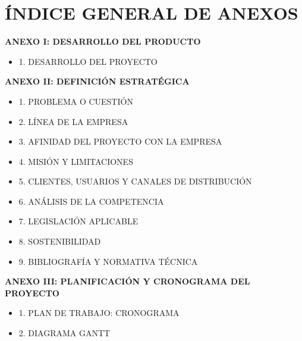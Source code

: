 \documentclass[11pt,a4paper]{article}
\begin{document}
\newpage
\section*{ÍNDICE GENERAL DE ANEXOS}

\vspace{0.5cm}

\begin{description}[style=nextline, leftmargin=0.5cm, font=\bfseries\color{ArthroNavy}]


    
   \item \textbf{ANEXO I: DESARROLLO DEL PRODUCTO} 
        \begin{itemize}[label=\color{ArthroGray}\circ, leftmargin=0.5cm, itemsep=0.2em, topsep=0.1cm]
            \small
            \item 1. DESARROLLO DEL PROYECTO 
        \end{itemize}
        
        \item \textbf{ANEXO II: DEFINICIÓN ESTRATÉGICA} 
        \begin{itemize}[label=\color{ArthroGray}\circ, leftmargin=0.5cm, itemsep=0.2em, topsep=0.1cm]
            \small
            \item 1. PROBLEMA O CUESTIÓN
            \item 2. LÍNEA DE LA EMPRESA 
            \item 3. AFINIDAD DEL PROYECTO CON LA EMPRESA 
            \item 4. MISIÓN Y LIMITACIONES
            \item 5. CLIENTES, USUARIOS Y CANALES DE DISTRIBUCIÓN 
            \item 6. ANÁLISIS DE LA COMPETENCIA 
            \item 7. LEGISLACIÓN APLICABLE 
            \item 8. SOSTENIBILIDAD 
            \item 9. BIBLIOGRAFÍA Y NORMATIVA TÉCNICA 
        \end{itemize}
        
        \item \textbf{ANEXO III: PLANIFICACIÓN Y CRONOGRAMA DEL PROYECTO} 
        \begin{itemize}[label=\color{ArthroGray}\circ, leftmargin=0.5cm, itemsep=0.2em, topsep=0.1cm]
            \small
            \item 1. PLAN DE TRABAJO: CRONOGRAMA 
            \item 2. DIAGRAMA GANTT 
            

\end{itemize}
\end{description}
\end{document}

